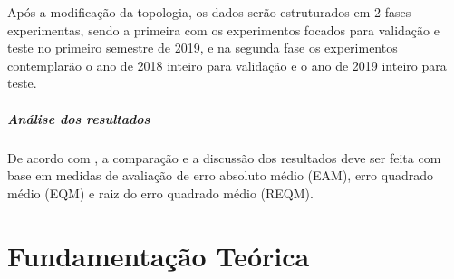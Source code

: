 \documentclass[	12pt, Times, openright, twoside, a4paper, english, brazil]{abntex2}
\begin{document}
          Após a modificação da topologia, os dados serão estruturados em 2 fases experimentas, sendo a primeira com os experimentos focados para validação e teste no primeiro semestre de 2019, e na segunda fase os experimentos contemplarão o ano de 2018 inteiro para validação e o ano de 2019 inteiro para teste.

        
        \paragraph*{Análise dos resultados}
        De acordo com \cite{Flavia2014}, a comparação e a discussão dos resultados deve ser feita com base em medidas de avaliação de erro absoluto médio (EAM), erro quadrado médio (EQM) e raiz do erro quadrado médio (REQM).
  \chapter{Fundamentação Teórica}

\end{document}
